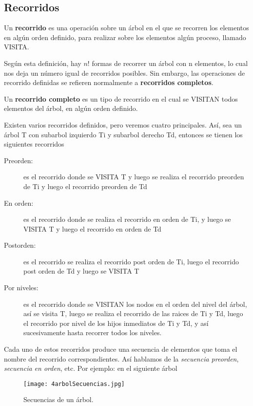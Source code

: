 \subsection{Recorridos}
\label{sec:recorridos}
\begin{definicion}
  Un \textbf{recorrido} es una operación sobre un árbol en el que se
  recorren los elementos en algún orden definido, para realizar sobre
  los elementos algún proceso, llamado VISITA.
\end{definicion}

Según esta definición, hay $n!$ formas de recorrer un árbol con n
elementos, lo cual nos deja un número igual de recorridos posibles.
Sin embargo, las operaciones de recorrido definidas se refieren
normalmente a \textbf{recorridos completos}.

\begin{definicion}
  Un \textbf{recorrido completo} es un tipo de recorrido en el cual se
  VISITAN todos elementos del árbol, en algún orden definido.
\end{definicion}


Existen varios recorridos definidos, pero veremos cuatro principales.
Así, sea un árbol T con subarbol izquierdo Ti y subarbol derecho Td,
entonces se tienen los siguientes recorridos

\begin{description}
\item[Preorden: ] es el recorrido donde se VISITA T y luego se realiza
  el recorrido preorden de Ti y luego el recorrido preorden de Td
\item[En orden: ] es el recorrido donde se realiza el recorrido en
  orden de Ti, y luego se VISITA T y luego el recorrido en orden de Td
\item[Postorden: ] es el recorrido se realiza el recorrido post orden
  de Ti, luego el recorrido post orden de Td y luego se VISITA T
\item[Por niveles: ] es el recorrido donde se VISITAN los nodos en el
  orden del nivel del árbol, así se visita T, luego se realiza el
  recorrido de las raices de Ti y Td, luego el recorrido por nivel de
  los hijos inmediatos de Ti y Td, y así sucesivamente hasta recorrer
  todos los niveles.
\end{description}

Cada uno de estos recorridos produce una secuencia de elementos que
toma el nombre del recorrido correspondientes.  Así hablamos de la
\textit{secuencia preorden}, \textit{secuencia en orden}, etc.
Por ejemplo: en el siguiente árbol
\begin{figure}[H]
  \centering
  \texttt{[image: 4arbolSecuencias.jpg]}
  \caption{Secuencias de un árbol.}
  \label{fig:4arbolSecuencias}
\end{figure}

